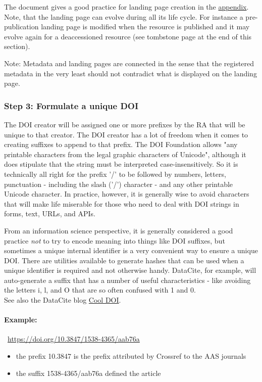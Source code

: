 \documentclass[11pt,a4paper]{ivoa}
\begin{document}
The document gives a good practice for landing page creation  in the \hyperlink{appendix}{appendix}. Note, that the landing page can evolve during all its life cycle. For instance a pre-publication landing page is modified when  the resource is published and it may evolve again for a deaccessioned resource (see tombstone page at the end of this section).

Note: Metadata and landing pages are connected in the sense that the registered metadata in the very least should not contradict what is displayed on the landing page.

\subsubsection{Step 3: Formulate a unique DOI}\hypertarget{step-3-formulate-a-unique-doi}{}\label{sec:step-3-formulate-a-unique-doi}

The DOI creator will be assigned one or more prefixes by the RA that will be unique to that creator. The DOI creator has a lot of freedom when it comes to creating suffixes to append to that prefix. The DOI Foundation allows "any printable characters from the legal graphic characters of Unicode", although it does stipulate that the string must be interpreted case-insensitively. So it is technically all right for the prefix '/' to be followed by numbers, letters, punctuation - including the slash ('/') character - and any other printable Unicode character. In practice, however, it is generally wise to avoid characters that will make life miserable for those who need to deal with DOI strings in forms, text, URLs, and APIs.

From an information science perspective, it is generally considered a good practice \emph{not} to try to encode meaning into things like DOI suffixes, but sometimes a unique internal identifier is a very convenient way to ensure a unique DOI. There are utilities available to generate hashes that can be used when a unique identifier is required and not otherwise handy. DataCite, for example, will auto-generate a suffix that has a number of useful characteristics - like avoiding the letters i, l,  and O that are so often confused with 1 and 0.\\

See also the DataCite blog \href{https://datacite.org/blog/cool-dois/}{Cool DOI}.

\paragraph{Example:} \url{https://doi.org/10.3847/1538-4365/aab76a}
\begin{itemize}
\item{} the prefix 10.3847 is the prefix attributed by Crossref to the AAS journals
\item{} the suffix 1538-4365/aab76a defined the article
\end{itemize}
\end{document}
